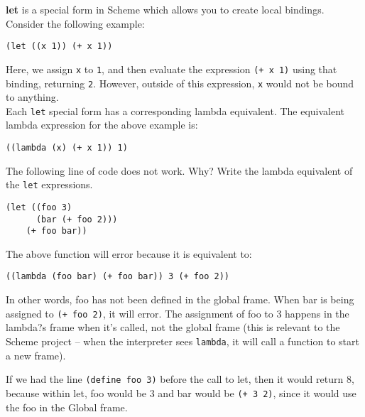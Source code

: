 \begin{blocksection}
\textbf{let} is a special form in Scheme which allows you to create local bindings. Consider the following example:
\newline
\begin{lstlisting}
(let ((x 1)) (+ x 1))
\end{lstlisting}
Here, we assign \texttt{x} to \texttt{1}, and then evaluate the expression \texttt{(+ x 1)} using that binding, returning \texttt{2}. However, outside of this expression, \texttt{x} would not be bound to anything. \\
Each \texttt{let} special form has a corresponding lambda equivalent. The equivalent lambda expression for the above example is: 
\begin{lstlisting}
((lambda (x) (+ x 1)) 1)
\end{lstlisting}
\question
The following line of code does not work. Why? Write the lambda
equivalent of the \texttt{let} expressions.

\begin{lstlisting}
(let ((foo 3)
      (bar (+ foo 2)))
    (+ foo bar))
\end{lstlisting}
\end{blocksection}
\begin{blocksection}
\begin{solution}
The above function will error because it is equivalent to:
\begin{lstlisting}
((lambda (foo bar) (+ foo bar)) 3 (+ foo 2))
\end{lstlisting}

In other words, foo has not been defined in the global frame. When bar is being
assigned to \texttt{(+ foo 2)}, it will error. The assignment of foo to 3
happens in the lambda?s frame when it's called, not the global frame (this is
relevant to the Scheme project -- when the interpreter sees \texttt{lambda}, it
will call a function to start a new frame).

If we had the line \texttt{(define foo 3)} before the call to let, then it would
return 8, because within let, foo would be 3 and bar would be \texttt{(+ 3 2)},
since it would use the foo in the Global frame.
\end{solution}

\end{blocksection}
